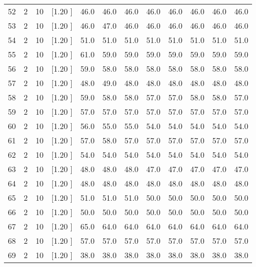 \documentclass[12pt,a4paper]{article}
\begin{document}
\begin{center}
{\begin{tabular}{r r r r r r r r r r r r}
  52&  2& 10&[1.20      ]&    46.0&    46.0&    46.0&    46.0&    46.0&    46.0&    46.0&    46.0\\[-0.02in]
  53&  2& 10&[1.20      ]&    46.0&    47.0&    46.0&    46.0&    46.0&    46.0&    46.0&    46.0\\[-0.02in]
  54&  2& 10&[1.20      ]&    51.0&    51.0&    51.0&    51.0&    51.0&    51.0&    51.0&    51.0\\[-0.02in]
  55&  2& 10&[1.20      ]&    61.0&    59.0&    59.0&    59.0&    59.0&    59.0&    59.0&    59.0\\[-0.02in]
  56&  2& 10&[1.20      ]&    59.0&    58.0&    58.0&    58.0&    58.0&    58.0&    58.0&    58.0\\[-0.02in]
  57&  2& 10&[1.20      ]&    48.0&    49.0&    48.0&    48.0&    48.0&    48.0&    48.0&    48.0\\[-0.02in]
  58&  2& 10&[1.20      ]&    59.0&    58.0&    58.0&    57.0&    57.0&    58.0&    58.0&    57.0\\[-0.02in]
  59&  2& 10&[1.20      ]&    57.0&    57.0&    57.0&    57.0&    57.0&    57.0&    57.0&    57.0\\[-0.02in]
  60&  2& 10&[1.20      ]&    56.0&    55.0&    55.0&    54.0&    54.0&    54.0&    54.0&    54.0\\[-0.02in]
  61&  2& 10&[1.20      ]&    57.0&    58.0&    57.0&    57.0&    57.0&    57.0&    57.0&    57.0\\[-0.02in]
  62&  2& 10&[1.20      ]&    54.0&    54.0&    54.0&    54.0&    54.0&    54.0&    54.0&    54.0\\[-0.02in]
  63&  2& 10&[1.20      ]&    48.0&    48.0&    48.0&    47.0&    47.0&    47.0&    47.0&    47.0\\[-0.02in]
  64&  2& 10&[1.20      ]&    48.0&    48.0&    48.0&    48.0&    48.0&    48.0&    48.0&    48.0\\[-0.02in]
  65&  2& 10&[1.20      ]&    51.0&    51.0&    51.0&    50.0&    50.0&    50.0&    50.0&    50.0\\[-0.02in]
  66&  2& 10&[1.20      ]&    50.0&    50.0&    50.0&    50.0&    50.0&    50.0&    50.0&    50.0\\[-0.02in]
  67&  2& 10&[1.20      ]&    65.0&    64.0&    64.0&    64.0&    64.0&    64.0&    64.0&    64.0\\[-0.02in]
  68&  2& 10&[1.20      ]&    57.0&    57.0&    57.0&    57.0&    57.0&    57.0&    57.0&    57.0\\[-0.02in]
  69&  2& 10&[1.20      ]&    38.0&    38.0&    38.0&    38.0&    38.0&    38.0&    38.0&    38.0\\[-0.02in]

\end{tabular}}
\end{center}
\end{document}
